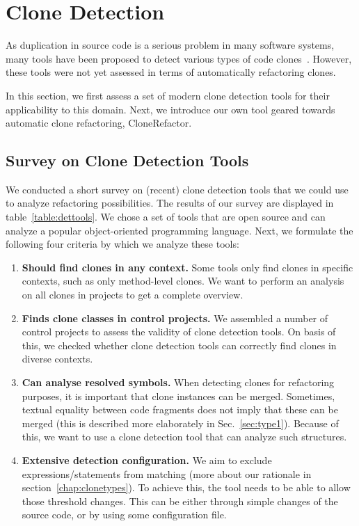 \documentclass[a4paper]{article}
\begin{document}
\section{Clone Detection}\label{chap:clonedetection}
As duplication in source code is a serious problem in many software systems, many tools have been proposed to detect various types of code clones~\cite{sheneamer2016survey, svajlenko2014evaluating}. However, these tools were not yet assessed in terms of automatically refactoring clones.

In this section, we first assess a set of modern clone detection tools for their applicability to this domain. Next, we introduce our own tool geared towards automatic clone refactoring, CloneRefactor.%

\subsection{Survey on Clone Detection Tools}
\label{ch:tool-overview}
We conducted a short survey on (recent) clone detection tools that we could use to analyze refactoring possibilities. The results of our survey are displayed in table~\ref{table:dettools}. We chose a set of tools that are open source and can analyze a popular object-oriented programming language. Next, we formulate the following four criteria by which we analyze these tools:
\begin{enumerate}
    \item \textbf{Should find clones in any context.} Some tools only find clones in specific contexts, such as only method-level clones. We want to perform an analysis on all clones in projects to get a complete overview.
\item \textbf{Finds clone classes in control projects.} We assembled a number of control projects to assess the validity of clone detection tools. On basis of this, we checked whether clone detection tools can correctly find clones in diverse contexts.
\item \textbf{Can analyse resolved symbols.} When detecting clones for refactoring purposes, it is important that clone instances can be merged. Sometimes, textual equality between code fragments does not imply that these can be merged (this is described more elaborately in Sec.~\ref{sec:type1}). Because of this, we want to use a clone detection tool that can analyze such structures.
\item \textbf{Extensive detection configuration.} We aim to exclude expressions/statements from matching (more about our rationale in section~\ref{chap:clonetypes}). To achieve this, the tool needs to be able to allow those threshold changes. This can be either through simple changes of the source code, or by using some configuration file.
\end{enumerate}
\end{document}
